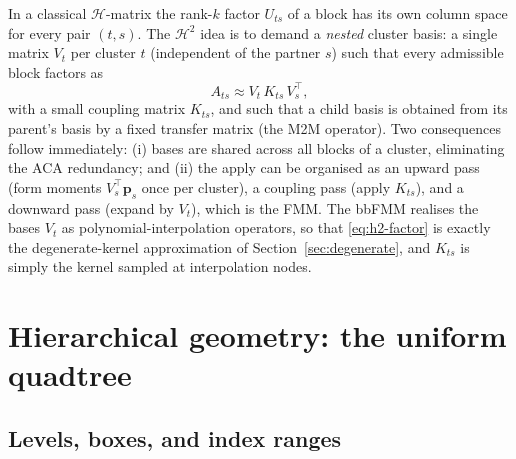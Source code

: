 \documentclass[11pt,a4paper]{article}
\newcommand{\pp}{\mathbf{p}}
\newcommand{\Htwo}{\mathcal{H}^2}
\newcommand{\Hmat}{\mathcal{H}}
\theoremstyle{definition}
\theoremstyle{remark}
\begin{document}
In a classical $\Hmat$-matrix the rank-$k$ factor $U_{ts}$ of a block has its own
column space for every pair $(t,s)$. The $\Htwo$ idea is to demand a
\emph{nested} cluster basis: a single matrix $V_t$ per cluster $t$ (independent
of the partner $s$) such that every admissible block factors as
\begin{equation}
  A_{ts} \approx V_t\, K_{ts}\, V_s^\top,
  \label{eq:h2-factor}
\end{equation}
with a small coupling matrix $K_{ts}$, and such that a child basis is obtained
from its parent's basis by a fixed transfer matrix (the M2M operator). Two
consequences follow immediately: (i) bases are shared across all blocks of a
cluster, eliminating the ACA redundancy; and (ii) the apply can be organised as
an upward pass (form moments $V_s^\top \pp_s$ once per cluster), a coupling pass
(apply $K_{ts}$), and a downward pass (expand by $V_t$), which is the FMM. The
bbFMM realises the bases $V_t$ as polynomial-interpolation operators, so that
\eqref{eq:h2-factor} is exactly the degenerate-kernel approximation of
Section~\ref{sec:degenerate}, and $K_{ts}$ is simply the kernel sampled at
interpolation nodes.

\section{Hierarchical geometry: the uniform quadtree}
\label{sec:tree}

\subsection{Levels, boxes, and index ranges}
\end{document}
